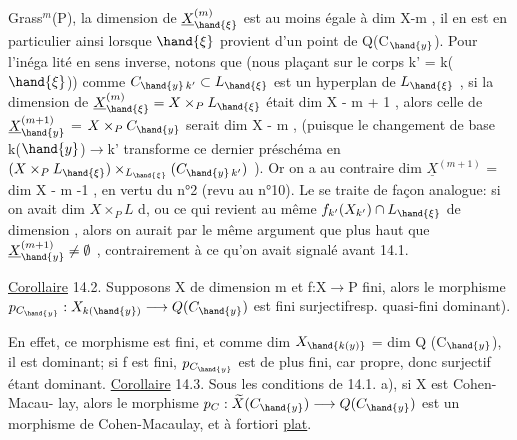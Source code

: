
Grass$^{m}$(P), la dimension de $\underline{X}^{(m)}_{\hand{\xi}}$ est au moins égale à dim X-m , il en est
en particulier ainsi lorsque $\hand{\xi}$ provient d'un point de Q(C$_{\hand{y}}$). Pour l'inéga
lité en sens inverse, notons que (nous plaçant sur le corps k' = k($\hand{\xi}$))
comme $C_{\hand{y}\,k'} \subset L_{\hand{\xi}}$ est  un hyperplan de $L_{\hand{\xi}}$ , si la dimension de
$\underline{X}^{(m)}_{\hand{\xi}} = X\times_{P}L_{\hand{\xi}}$ était \over{>}{$\geqslant$} dim X - m + 1 , alors celle de $\underline{X}^{(m+1)}_{\hand{y}}$ =
$X\times_{P}C_{\hand{y}}$ serait \over{>}{$\geqslant$} dim X - m \xout{+}, (puisque le changement de base k($\hand{y}$)$\to$k'
transforme ce dernier préschéma en $(X\times_{P}L_{\hand{\xi}})\times_{L_{\hand{\xi}}}(C_{\hand{y}\,k'})$ ). Or on a au
contraire  dim $\underline{X}^{(m+1)}$ = dim X - m -1 
, en vertu du n°2 (revu au n°10).
Le   se traite
de façon analogue: si on avait dim $X\times_{P}L$ \hand{$\geqslant$} d,  ou
ce qui revient au même  $f_{k'}(X_{k'}) \cap L_{\hand{\xi}}$ de dimension \hand{$\geqslant$},
alors on aurait par le même argument que plus  haut que
$\underline{X}^{(m+1)}_{\hand{y}} \neq \emptyset$ , contrairement à ce qu'on avait signalé avant 14.1.

\uline{Corollaire} 14.2. Supposons X de dimension m et f:X$\to$P fini, alors
le morphisme $p_{C_{\hand{y}}} : X_{k(\hand{y})} \longrightarrow Q(C_{\hand{y}})$ est fini surjectif\hand{(}resp. quasi-fini
dominant).

En effet, ce morphisme est fini, et comme dim $X_{\hand{k(y)}}$ = dim Q (C$_{\hand{y}}$), il est
dominant;  si f est fini, $p_{C_{\hand{y}}}$ est de plus fini,
 car propre, donc surjectif étant dominant.
\uline{Corollaire} 14.3. Sous les conditions de 14.1. a), si X est Cohen-Macau-%
lay, alors le morphisme $p_{C} : \widetilde{X}(C_{\hand{y}}) \longrightarrow Q(C_{\hand{y}})$ est un morphisme de
Cohen-Macaulay, et à fortiori \uline{plat}.

